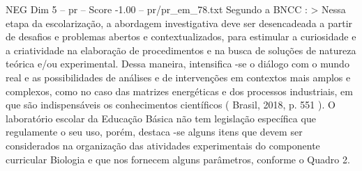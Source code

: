 \begin{textsample}{NEG Dim 5 – pr – Score -1.00 – pr/pr\_em\_78.txt}
Segundo a BNCC : > Nessa etapa da escolarização, a abordagem investigativa deve ser desencadeada a partir de desafios e problemas abertos e contextualizados, para estimular a curiosidade e a criatividade na elaboração de procedimentos e na busca de soluções de natureza teórica e/ou experimental.
Dessa maneira, intensifica -se o diálogo com o mundo real e as possibilidades de análises e de intervenções em contextos mais amplos e complexos, como no caso das matrizes energéticas e dos processos industriais, em que são indispensáveis os conhecimentos científicos ( Brasil, 2018, p. 551 ).
O laboratório escolar da Educação Básica não tem legislação específica que regulamente o seu uso, porém, destaca -se alguns itens que devem ser considerados na organização das atividades experimentais do componente curricular Biologia e que nos fornecem alguns parâmetros, conforme o Quadro 2.

\end{textsample}
